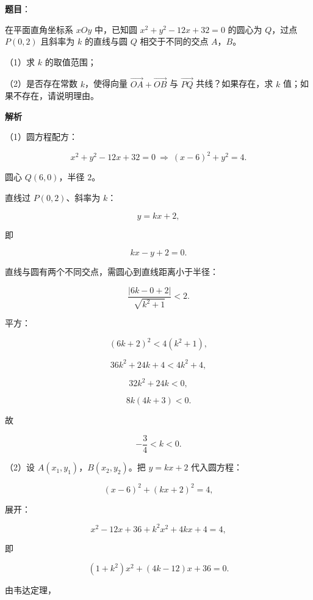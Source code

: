 \begin{answer}

\textbf{题目}：

在平面直角坐标系 $xOy$ 中，已知圆 $x^2+y^2-12x+32=0$ 的圆心为 $Q$，过点 $P(0,2)$ 且斜率为 $k$ 的直线与圆 $Q$ 相交于不同的交点 $A$，$B$。

（1）求 $k$ 的取值范围；

（2）是否存在常数 $k$，使得向量 $\overrightarrow{OA}+\overrightarrow{OB}$ 与 $\overrightarrow{PQ}$ 共线？如果存在，求 $k$ 值；如果不存在，请说明理由。

\textbf{解析}

（1）圆方程配方：

\nopagebreak[4]
\[x^2+y^2-12x+32=0\ \Rightarrow\ (x-6)^2+y^2=4.\]

圆心 $Q(6,0)$，半径 $2$。

直线过 $P(0,2)$、斜率为 $k$：

\nopagebreak[4]
\[y=kx+2,\]

即

\nopagebreak[4]
\[kx-y+2=0.\]

直线与圆有两个不同交点，需圆心到直线距离小于半径：

\nopagebreak[4]
\[\frac{|6k-0+2|}{\sqrt{k^2+1}}<2.\]

平方：

\nopagebreak[4]
\[(6k+2)^2<4(k^2+1),\]

\nopagebreak[4]
\[36k^2+24k+4<4k^2+4,\]

\nopagebreak[4]
\[32k^2+24k<0,\]

\nopagebreak[4]
\[8k(4k+3)<0.\]

故

\nopagebreak[4]
\[-\frac34<k<0.\]

（2）设 $A(x_1,y_1)$，$B(x_2,y_2)$。把 $y=kx+2$ 代入圆方程：

\nopagebreak[4]
\[(x-6)^2+(kx+2)^2=4,\]

展开：

\nopagebreak[4]
\[x^2-12x+36+k^2x^2+4kx+4=4,\]

即

\nopagebreak[4]
\[(1+k^2)x^2+(4k-12)x+36=0.\]

由韦达定理，


\end{answer}
